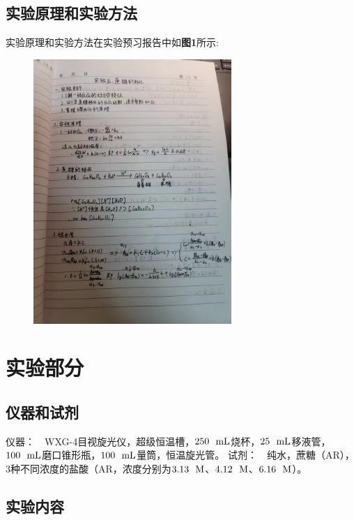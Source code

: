 \documentclass[12pt]{article}
\begin{document}
			\subsection{实验原理和实验方法}
				实验原理和实验方法在实验预习报告中如\textbf{图1}所示: \par
		\begin{figure}[h]
			\centering
			\includegraphics[width=0.67\textwidth]{1.png}
		\end{figure}

	     
    \section{实验部分}

    	\subsection{仪器和试剂}
    		仪器：\ \  WXG-4目视旋光仪，超级恒温槽，$250\ \ {\rm mL}$烧杯，$25\ \ {\rm mL}$移液管，$100\ \ {\rm mL}$磨口锥形瓶，$100\ \ {\rm mL}$量筒，恒温旋光管。
			试剂：\ \  纯水，蔗糖（AR），$3$种不同浓度的盐酸（AR，浓度分别为$3.13\ \ {\rm M}$、$4.12\ \ {\rm M}$、$6.16\ \ {\rm M}$）。

    	 \subsection{实验内容\citealp{physchemlab}}
\end{document}
